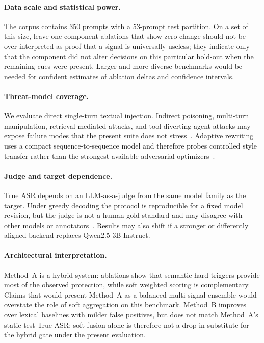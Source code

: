 \documentclass{article}
\begin{document}
\paragraph{Data scale and statistical power.}
The corpus contains 350 prompts with a 53-prompt test partition.
On a set of this size, leave-one-component ablations that show zero change should not be over-interpreted as proof that a signal is universally useless; they indicate only that the component did not alter decisions on this particular hold-out when the remaining cues were present.
Larger and more diverse benchmarks would be needed for confident estimates of ablation deltas and confidence intervals.

\paragraph{Threat-model coverage.}
We evaluate direct single-turn textual injection.
Indirect poisoning, multi-turn manipulation, retrieval-mediated attacks, and tool-diverting agent attacks may expose failure modes that the present suite does not stress~\cite{greshake2023indirect,debenedetti2024agentdojo,wu2025epistemic}.
Adaptive rewriting uses a compact sequence-to-sequence model and therefore probes controlled style transfer rather than the strongest available adversarial optimizers~\cite{yi2024jailbreak,zizzo2025adversarial}.

\paragraph{Judge and target dependence.}
True ASR depends on an LLM-as-a-judge from the same model family as the target.
Under greedy decoding the protocol is reproducible for a fixed model revision, but the judge is not a human gold standard and may disagree with other models or annotators~\cite{zizzo2025adversarial}.
Results may also shift if a stronger or differently aligned backend replaces Qwen2.5-3B-Instruct.

\paragraph{Architectural interpretation.}
Method~A is a hybrid system: ablations show that semantic hard triggers provide most of the observed protection, while soft weighted scoring is complementary.
Claims that would present Method~A as a balanced multi-signal ensemble would overstate the role of soft aggregation on this benchmark.
Method~B improves over lexical baselines with milder false positives, but does not match Method~A's static-test True ASR; soft fusion alone is therefore not a drop-in substitute for the hybrid gate under the present evaluation.
\end{document}
